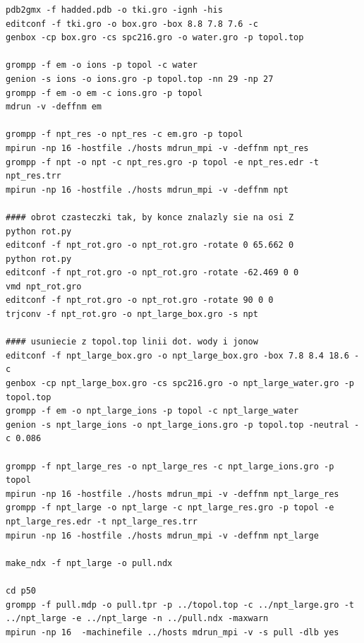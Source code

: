 \begin{lstlisting}[label={kod:polecenia}, caption={Polecenia Gromacsa używane  podczas symulacji podane w kolejności wykonywania}]
pdb2gmx -f hadded.pdb -o tki.gro -ignh -his
editconf -f tki.gro -o box.gro -box 8.8 7.8 7.6 -c
genbox -cp box.gro -cs spc216.gro -o water.gro -p topol.top 

grompp -f em -o ions -p topol -c water
genion -s ions -o ions.gro -p topol.top -nn 29 -np 27
grompp -f em -o em -c ions.gro -p topol
mdrun -v -deffnm em

grompp -f npt_res -o npt_res -c em.gro -p topol
mpirun -np 16 -hostfile ./hosts mdrun_mpi -v -deffnm npt_res
grompp -f npt -o npt -c npt_res.gro -p topol -e npt_res.edr -t npt_res.trr
mpirun -np 16 -hostfile ./hosts mdrun_mpi -v -deffnm npt

#### obrot czasteczki tak, by konce znalazly sie na osi Z
python rot.py
editconf -f npt_rot.gro -o npt_rot.gro -rotate 0 65.662 0
python rot.py
editconf -f npt_rot.gro -o npt_rot.gro -rotate -62.469 0 0
vmd npt_rot.gro
editconf -f npt_rot.gro -o npt_rot.gro -rotate 90 0 0
trjconv -f npt_rot.gro -o npt_large_box.gro -s npt

#### usuniecie z topol.top linii dot. wody i jonow
editconf -f npt_large_box.gro -o npt_large_box.gro -box 7.8 8.4 18.6 -c
genbox -cp npt_large_box.gro -cs spc216.gro -o npt_large_water.gro -p topol.top 
grompp -f em -o npt_large_ions -p topol -c npt_large_water
genion -s npt_large_ions -o npt_large_ions.gro -p topol.top -neutral -c 0.086

grompp -f npt_large_res -o npt_large_res -c npt_large_ions.gro -p topol
mpirun -np 16 -hostfile ./hosts mdrun_mpi -v -deffnm npt_large_res
grompp -f npt_large -o npt_large -c npt_large_res.gro -p topol -e npt_large_res.edr -t npt_large_res.trr
mpirun -np 16 -hostfile ./hosts mdrun_mpi -v -deffnm npt_large

make_ndx -f npt_large -o pull.ndx

cd p50
grompp -f pull.mdp -o pull.tpr -p ../topol.top -c ../npt_large.gro -t ../npt_large -e ../npt_large -n ../pull.ndx -maxwarn
mpirun -np 16  -machinefile ../hosts mdrun_mpi -v -s pull -dlb yes
\end{lstlisting}
